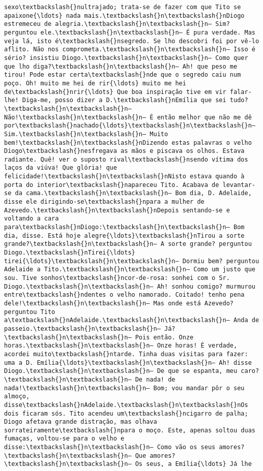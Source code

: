 \begin{Verbatim}[commandchars=\\\{\}]
sexo\textbackslash{}nultrajado; trata-se de fazer com que Tito se apaixone{\ldots} nada mais.\textbackslash{}n\textbackslash{}nDiogo estremeceu de alegria.\textbackslash{}n\textbackslash{}n— Sim? perguntou ele.\textbackslash{}n\textbackslash{}n— É pura verdade. Mas veja lá, isto é\textbackslash{}nsegredo. Se lho descobri foi por vê-lo aflito. Não nos comprometa.\textbackslash{}n\textbackslash{}n— Isso é sério? insistiu Diogo.\textbackslash{}n\textbackslash{}n— Como quer que lho diga?\textbackslash{}n\textbackslash{}n— Ah! que peso me tirou! Pode estar certa\textbackslash{}nde que o segredo caiu num poço. Oh! muito me hei de rir{\ldots} muito me hei de\textbackslash{}nrir{\ldots} Que boa inspiração tive em vir falar-lhe! Diga-me, posso dizer a D.\textbackslash{}nEmília que sei tudo?\textbackslash{}n\textbackslash{}n— Não!\textbackslash{}n\textbackslash{}n— É então melhor que não me dê por\textbackslash{}nachado{\ldots}\textbackslash{}n\textbackslash{}n— Sim.\textbackslash{}n\textbackslash{}n— Muito bem!\textbackslash{}n\textbackslash{}nDizendo estas palavras o velho Diogo\textbackslash{}nesfregava as mãos e piscava os olhos. Estava radiante. Quê! ver o suposto rival\textbackslash{}nsendo vítima dos laços da viúva! Que glória! que felicidade!\textbackslash{}n\textbackslash{}nNisto estava quando à porta do interior\textbackslash{}napareceu Tito. Acabava de levantar-se da cama.\textbackslash{}n\textbackslash{}n— Bom dia, D. Adelaide, disse ele dirigindo-se\textbackslash{}npara a mulher de Azevedo.\textbackslash{}n\textbackslash{}nDepois sentando-se e voltando a cara para\textbackslash{}nDiogo:\textbackslash{}n\textbackslash{}n— Bom dia, disse. Está hoje alegre{\ldots}\textbackslash{}nTirou a sorte grande?\textbackslash{}n\textbackslash{}n— A sorte grande? perguntou Diogo.\textbackslash{}nTirei{\ldots} tirei{\ldots}\textbackslash{}n\textbackslash{}n— Dormiu bem? perguntou Adelaide a Tito.\textbackslash{}n\textbackslash{}n— Como um justo que sou. Tive sonhos\textbackslash{}ncor-de-rosa: sonhei com o Sr. Diogo.\textbackslash{}n\textbackslash{}n— Ah! sonhou comigo? murmurou entre\textbackslash{}ndentes o velho namorado. Coitado! tenho pena dele!\textbackslash{}n\textbackslash{}n— Mas onde está Azevedo? perguntou Tito a\textbackslash{}nAdelaide.\textbackslash{}n\textbackslash{}n— Anda de passeio.\textbackslash{}n\textbackslash{}n— Já?\textbackslash{}n\textbackslash{}n— Pois então. Onze horas.\textbackslash{}n\textbackslash{}n— Onze horas! É verdade, acordei muito\textbackslash{}ntarde. Tinha duas visitas para fazer: uma a D. Emília{\ldots}\textbackslash{}n\textbackslash{}n— Ah! disse Diogo.\textbackslash{}n\textbackslash{}n— De que se espanta, meu caro?\textbackslash{}n\textbackslash{}n— De nada! de nada!\textbackslash{}n\textbackslash{}n— Bom; vou mandar pôr o seu almoço, disse\textbackslash{}nAdelaide.\textbackslash{}n\textbackslash{}nOs dois ficaram sós. Tito acendeu um\textbackslash{}ncigarro de palha; Diogo afetava grande distração, mas olhava sorrateiramente\textbackslash{}npara o moço. Este, apenas soltou duas fumaças, voltou-se para o velho e disse:\textbackslash{}n\textbackslash{}n— Como vão os seus amores?\textbackslash{}n\textbackslash{}n— Que amores?\textbackslash{}n\textbackslash{}n— Os seus, a Emília{\ldots} Já lhe 
\end{Verbatim}
